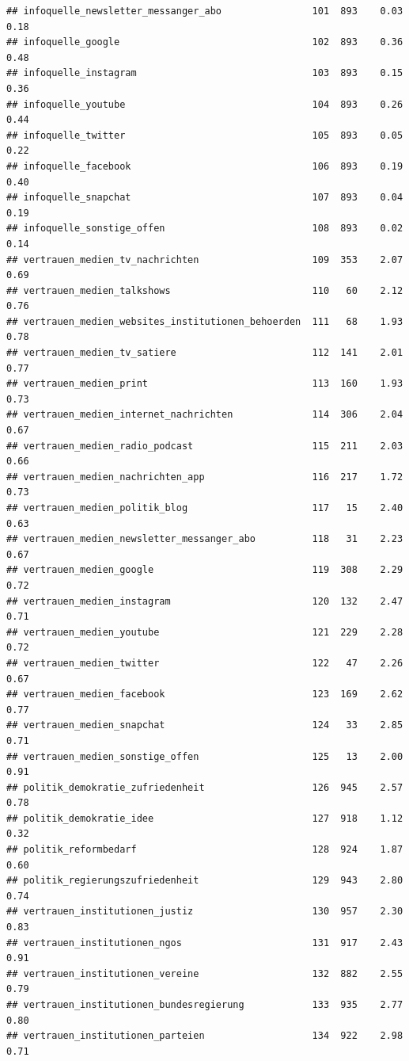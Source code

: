 \documentclass[
]{book}
\begin{document}
\begin{verbatim}
## infoquelle_newsletter_messanger_abo                101  893    0.03   0.18
## infoquelle_google                                  102  893    0.36   0.48
## infoquelle_instagram                               103  893    0.15   0.36
## infoquelle_youtube                                 104  893    0.26   0.44
## infoquelle_twitter                                 105  893    0.05   0.22
## infoquelle_facebook                                106  893    0.19   0.40
## infoquelle_snapchat                                107  893    0.04   0.19
## infoquelle_sonstige_offen                          108  893    0.02   0.14
## vertrauen_medien_tv_nachrichten                    109  353    2.07   0.69
## vertrauen_medien_talkshows                         110   60    2.12   0.76
## vertrauen_medien_websites_institutionen_behoerden  111   68    1.93   0.78
## vertrauen_medien_tv_satiere                        112  141    2.01   0.77
## vertrauen_medien_print                             113  160    1.93   0.73
## vertrauen_medien_internet_nachrichten              114  306    2.04   0.67
## vertrauen_medien_radio_podcast                     115  211    2.03   0.66
## vertrauen_medien_nachrichten_app                   116  217    1.72   0.73
## vertrauen_medien_politik_blog                      117   15    2.40   0.63
## vertrauen_medien_newsletter_messanger_abo          118   31    2.23   0.67
## vertrauen_medien_google                            119  308    2.29   0.72
## vertrauen_medien_instagram                         120  132    2.47   0.71
## vertrauen_medien_youtube                           121  229    2.28   0.72
## vertrauen_medien_twitter                           122   47    2.26   0.67
## vertrauen_medien_facebook                          123  169    2.62   0.77
## vertrauen_medien_snapchat                          124   33    2.85   0.71
## vertrauen_medien_sonstige_offen                    125   13    2.00   0.91
## politik_demokratie_zufriedenheit                   126  945    2.57   0.78
## politik_demokratie_idee                            127  918    1.12   0.32
## politik_reformbedarf                               128  924    1.87   0.60
## politik_regierungszufriedenheit                    129  943    2.80   0.74
## vertrauen_institutionen_justiz                     130  957    2.30   0.83
## vertrauen_institutionen_ngos                       131  917    2.43   0.91
## vertrauen_institutionen_vereine                    132  882    2.55   0.79
## vertrauen_institutionen_bundesregierung            133  935    2.77   0.80
## vertrauen_institutionen_parteien                   134  922    2.98   0.71

\end{verbatim}
\end{document}
